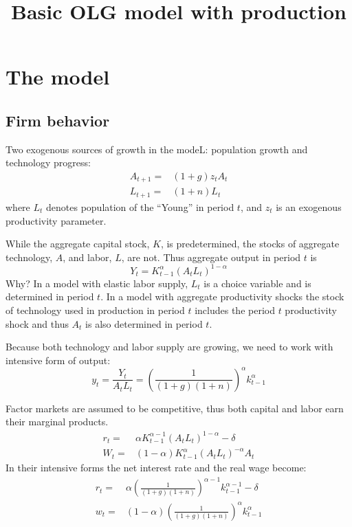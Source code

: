 \documentclass[11pt]{article}
\begin{document}
\title{Basic OLG model with production}

\section{The model}

\subsection{Firm behavior}
Two exogenous sources of growth in the modeL: population growth and technology progress:
\begin{align}
A_{t+1} =& (1 + g)z_tA_t \\
L_{t+1} =& (1 + n)L_t 
\end{align}
where $L_t$ denotes population of the ``Young'' in period $t$, and $z_t$ is an exogenous productivity parameter. 

While the aggregate capital stock, $K$, is predetermined, the stocks of aggregate technology, $A$, and labor, $L$, are not. Thus aggregate output in period $t$ is
\begin{equation}
Y_t = K_{t-1}^{\alpha}(A_tL_t)^{1-\alpha} 
\end{equation}
Why? In a model with elastic labor supply, $L_t$ is a choice variable and is determined in period $t$. In a model with aggregate productivity shocks the stock of technology used in production in period $t$ includes the period $t$ productivity shock and thus $A_t$ is also determined in period $t$. 

Because both technology and labor supply are growing, we need to work with intensive form of output:
\begin{equation}\label{eq:production}
y_t = \frac{Y_t}{A_tL_t} = \left(\frac{1}{(1 + g)(1 + n)}\right)^{\alpha}k^{\alpha}_{t-1}
\end{equation}

Factor markets are assumed to be competitive, thus both capital and labor earn their marginal products.
\begin{align}
r_t =& \alpha K_{t-1}^{\alpha - 1}(A_tL_t)^{1 - \alpha} - \delta \\
W_t =& (1 - \alpha) K_{t-1}^{\alpha}(A_tL_t)^{-\alpha}A_t
\end{align}
In their intensive forms the net interest rate and the real wage become:
\begin{align}
r_t =& \alpha \left(\frac{1}{(1 + g)(1 + n)}\right)^{\alpha-1}k^{\alpha-1}_{t-1} - \delta \\
w_t =& (1 - \alpha)\left(\frac{1}{(1 + g)(1 + n)}\right)^{\alpha}k^{\alpha}_{t-1}
\end{align}
\end{document}
